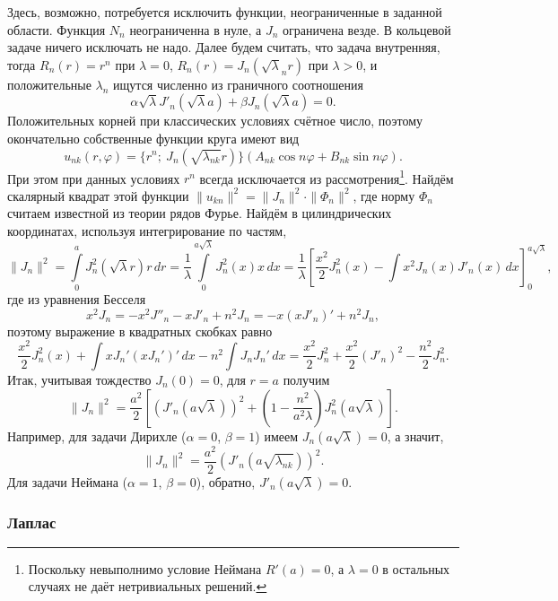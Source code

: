 Здесь, возможно, потребуется исключить функции, неограниченные в
заданной области. Функция $ N_n $ неограниченна в нуле, а $ J_n $ ограничена
везде.
В кольцевой задаче ничего исключать не надо. Далее будем считать, что задача
внутренняя, тогда $ R_n(r) = r^n $ при $ \lambda = 0 $, $ R_n(r) =
J_n(\sqrt\lambda_n r) $ при $ \lambda > 0 $, и положительные $
\lambda_n $ ищутся
численно из
граничного соотношения  
\[
    \alpha \sqrt\lambda J'_n(\sqrt\lambda a) + \beta J_n(\sqrt\lambda a) = 0.
\]
Положительных корней при классических условиях счётное число, поэтому окончательно собственные функции
круга имеют вид 
\[
u_{nk}(r, \varphi) = \{r^n; \ J_n(\sqrt{\lambda_{nk}} r)\}(A_{nk}\cos n\varphi +
  B_{nk}\sin
  n\varphi).
\]
При этом при данных условиях $ r^n $ всегда исключается из
рассмотрения\footnote{Поскольку невыполнимо условие Неймана $ R'(a) = 0 $, а $
\lambda = 0 $ в остальных случаях не даёт нетривиальных решений.}. Найдём скалярный квадрат этой функции $ \|u_{kn}\|^2 =
\|J_n\|^2\cdot\|\Phi_n\|^2 $, где норму $ \Phi_n $ считаем известной из
теории рядов Фурье. Найдём в цилиндрических координатах, используя
интегрирование по частям,
\[
    \|J_n\|^2 = \int\limits_{0}^{a} J^2_n(\sqrt\lambda r)r\,dr =
    \frac{1}{\lambda}\int\limits_{0}^{a\sqrt\lambda}J^2_n(x)x\,dx =
    \frac{1}{\lambda} \left[ \frac{x^2}{2}J^2_n(x) -
    \int x^2 J_n(x)J'_n(x)\,dx  \right]^{a\sqrt\lambda}_0,
\]
где из уравнения Бесселя
\[
  x^2 J_n = -x^2 J''_n - xJ'_n + n^2J_n = - x(xJ'_n)' + n^2 J_n,
\]
поэтому выражение в квадратных скобках равно
\[
  \frac{x^2}{2} J^2_n(x) + \int xJ_n' (xJ_n')'\,dx - n^2 \int J_n J_n' \, dx
  =
  \frac{x^2}{2} J^2_n + \frac{x^2}{2} (J'_n)^2 - \frac{n^2}{2} J^2_n.
\]
Итак, учитывая тождество $ J_n(0) = 0 $, для $ r = a $ получим
\[
    \|J_n\|^2 = \frac{a^2}{2} \left[ (J'_n(a\sqrt\lambda))^2 + \left( 1 -
    \frac{n^2}{a^2\lambda} \right) J_n^2 (a\sqrt\lambda) \right].
\]
Например, для задачи Дирихле ($ \alpha = 0 $, $ \beta = 1 $) имеем $
J_n(a\sqrt\lambda) = 0 $, а значит,  
\[
  \|J_n\|^2 = \frac{a^2}{2} (J'_n(a\sqrt{\lambda_{nk}}))^2.
\]
Для задачи Неймана ($ \alpha = 1 $, $ \beta = 0 $), обратно, $ J'_n(a\sqrt\lambda) = 0. $




\subsubsection{Лаплас}
